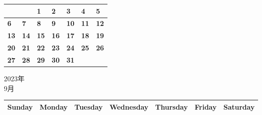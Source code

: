 \documentclass[a4paper,landscape]{jsarticle}
\newcommand{\dig}{\hspace{29mm}}
\newcommand{\tdig}{\hspace{27mm}}
\newcommand{\LBF}{\LARGE\textbf}
\begin{document}
\begingroup
\renewcommand{\arraystretch}{4}
\begin{tabular}{|p{32mm}|p{32mm}|p{32mm}|p{32mm}|p{32mm}|p{32mm}|p{32mm}|}
\hline
&&\raisebox{30pt} {\dig\LBF{1}}&\raisebox{30pt} {\dig\LBF{2}}&\raisebox{30pt} {\dig\LBF{3}}&\raisebox{30pt} {\dig\LBF{4}}&\raisebox{30pt} {\dig\LBF{5}}\\
\hline
\raisebox{30pt} {\dig\LBF{6}}&\raisebox{30pt} {\dig\LBF{7}}&\raisebox{30pt} {\dig\LBF{8}}&\raisebox{30pt} {\dig\LBF{9}}&\raisebox{30pt} {\tdig\LBF{10}}&\raisebox{30pt} {\tdig\LBF{11}}&\raisebox{30pt} {\tdig\LBF{12}}\\
\hline
\raisebox{30pt} {\tdig\LBF{13}}&\raisebox{30pt} {\tdig\LBF{14}}&\raisebox{30pt} {\tdig\LBF{15}}&\raisebox{30pt} {\tdig\LBF{16}}&\raisebox{30pt} {\tdig\LBF{17}}&\raisebox{30pt} {\tdig\LBF{18}}&\raisebox{30pt} {\tdig\LBF{19}}\\
\hline
\raisebox{30pt} {\tdig\LBF{20}}&\raisebox{30pt} {\tdig\LBF{21}}&\raisebox{30pt} {\tdig\LBF{22}}&\raisebox{30pt} {\tdig\LBF{23}}&\raisebox{30pt} {\tdig\LBF{24}}&\raisebox{30pt} {\tdig\LBF{25}}&\raisebox{30pt} {\tdig\LBF{26}}\\
\hline
\raisebox{30pt} {\tdig\LBF{27}}&\raisebox{30pt} {\tdig\LBF{28}}&\raisebox{30pt} {\tdig\LBF{29}}&\raisebox{30pt} {\tdig\LBF{30}}&\raisebox{30pt} {\tdig\LBF{31}}&&\\
\hline
\end{tabular}
\endgroup
\newpage\begin{center}
	\LARGE 2023年\\
	\LARGE 9月
\end{center}

\begingroup
\renewcommand{\arraystretch}{1.4}
\begin{tabular}{|>{\centering\arraybackslash}p{32mm}|>{\centering\arraybackslash}p{32mm}|>{\centering\arraybackslash}p{32mm}|>{\centering\arraybackslash}p{32mm}|>{\centering\arraybackslash}p{32mm}|>{\centering\arraybackslash}p{32mm}|>{\centering\arraybackslash}p{32mm}|}
\hline
\large Sunday&\large Monday &\large Tuesday&\large Wednesday&\large Thursday&\large Friday&\large Saturday\\
\hline
\end{tabular}
\endgroup
\end{document}

